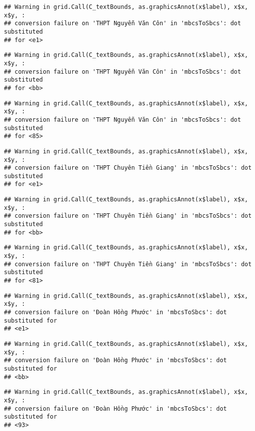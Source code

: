 \documentclass[
]{article}
\begin{document}
\begin{verbatim}
## Warning in grid.Call(C_textBounds, as.graphicsAnnot(x$label), x$x, x$y, :
## conversion failure on 'THPT Nguyễn Văn Côn' in 'mbcsToSbcs': dot substituted
## for <e1>
\end{verbatim}

\begin{verbatim}
## Warning in grid.Call(C_textBounds, as.graphicsAnnot(x$label), x$x, x$y, :
## conversion failure on 'THPT Nguyễn Văn Côn' in 'mbcsToSbcs': dot substituted
## for <bb>
\end{verbatim}

\begin{verbatim}
## Warning in grid.Call(C_textBounds, as.graphicsAnnot(x$label), x$x, x$y, :
## conversion failure on 'THPT Nguyễn Văn Côn' in 'mbcsToSbcs': dot substituted
## for <85>
\end{verbatim}

\begin{verbatim}
## Warning in grid.Call(C_textBounds, as.graphicsAnnot(x$label), x$x, x$y, :
## conversion failure on 'THPT Chuyên Tiền Giang' in 'mbcsToSbcs': dot substituted
## for <e1>
\end{verbatim}

\begin{verbatim}
## Warning in grid.Call(C_textBounds, as.graphicsAnnot(x$label), x$x, x$y, :
## conversion failure on 'THPT Chuyên Tiền Giang' in 'mbcsToSbcs': dot substituted
## for <bb>
\end{verbatim}

\begin{verbatim}
## Warning in grid.Call(C_textBounds, as.graphicsAnnot(x$label), x$x, x$y, :
## conversion failure on 'THPT Chuyên Tiền Giang' in 'mbcsToSbcs': dot substituted
## for <81>
\end{verbatim}

\begin{verbatim}
## Warning in grid.Call(C_textBounds, as.graphicsAnnot(x$label), x$x, x$y, :
## conversion failure on 'Đoàn Hồng Phước' in 'mbcsToSbcs': dot substituted for
## <e1>
\end{verbatim}

\begin{verbatim}
## Warning in grid.Call(C_textBounds, as.graphicsAnnot(x$label), x$x, x$y, :
## conversion failure on 'Đoàn Hồng Phước' in 'mbcsToSbcs': dot substituted for
## <bb>
\end{verbatim}

\begin{verbatim}
## Warning in grid.Call(C_textBounds, as.graphicsAnnot(x$label), x$x, x$y, :
## conversion failure on 'Đoàn Hồng Phước' in 'mbcsToSbcs': dot substituted for
## <93>
\end{verbatim}
\end{document}
